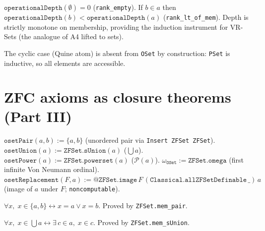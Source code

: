 \begin{theorem}
\label{thm:Lemma_II_3}
\leanok
{}
$\texttt{operationalDepth}(\emptyset) = 0$ (\texttt{rank\_empty}).
If $b \in a$ then $\texttt{operationalDepth}(b) <
\texttt{operationalDepth}(a)$ (\texttt{rank\_lt\_of\_mem}).  Depth is
strictly monotone on membership, providing the induction instrument
for VR-Sets (the analogue of A4 lifted to sets).

The cyclic case (Quine atom) is absent from \texttt{OSet} by
construction: \texttt{PSet} is inductive, so all elements are accessible.
\end{theorem}

\section{ZFC axioms as closure theorems (Part III)}
\label{sec:sets_zfc}

\begin{definition}
\label{def:set_ops}
\leanok
{}
$\texttt{osetPair}(a,b) := \{a,b\}$ (unordered pair via \texttt{Insert
ZFSet ZFSet}).
$\texttt{osetUnion}(a) := \texttt{ZFSet.sUnion}(a)$ ($\bigcup a$).
$\texttt{osetPower}(a) := \texttt{ZFSet.powerset}(a)$ ($\mathcal{P}(a)$).
$\omega_{\texttt{OSet}} := \texttt{ZFSet.omega}$ (first infinite Von
Neumann ordinal).
$\texttt{osetReplacement}(F, a) := @\texttt{ZFSet.image}\,F\,
(\texttt{Classical.allZFSetDefinable}\,\_)\,a$ (image of $a$ under $F$;
\texttt{noncomputable}).
\end{definition}

\begin{theorem}
\label{thm:T_III_3}
\leanok
{}
$\forall x,\; x \in \{a,b\} \leftrightarrow x = a \lor x = b$.
Proved by \texttt{ZFSet.mem\_pair}.
\end{theorem}

\begin{theorem}
\label{thm:T_III_4}
\leanok
{}
$\forall x,\; x \in \bigcup a \leftrightarrow \exists\, c \in a,\; x \in c$.
Proved by \texttt{ZFSet.mem\_sUnion}.
\end{theorem}

